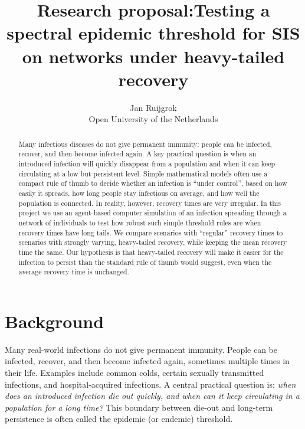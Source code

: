 \documentclass[11pt,a4paper]{article}
\title{Research proposal:Testing a spectral epidemic threshold for SIS on networks under heavy-tailed recovery}
\author{Jan Ruijgrok\\
  Open University of the Netherlands}
\date{} %
\begin{document}
\maketitle

\begin{abstract}
Many infectious diseases do not give permanent immunity: people can be infected, recover, and then become infected again. A key practical question is when an introduced infection will quickly disappear from a population and when it can keep circulating at a low but persistent level. Simple mathematical models often use a compact rule of thumb to decide whether an infection is ``under control'', based on how easily it spreads, how long people stay infectious on average, and how well the population is connected. In reality, however, recovery times are very irregular. In this project we use an agent-based computer simulation of an infection spreading through a network of individuals to test how robust such simple threshold rules are when recovery times have long tails. We compare scenarios with ``regular'' recovery times to scenarios with strongly varying, heavy-tailed recovery, while keeping the mean recovery time the same. Our hypothesis is that heavy-tailed recovery will make it easier for the infection to persist than the standard rule of thumb would suggest, even when the average recovery time is unchanged.
\end{abstract}

\section{Background}

Many real-world infections do not give permanent immunity. People can be infected, recover, and then become infected again, sometimes multiple times in their life. Examples include common colds, certain sexually transmitted infections, and hospital-acquired infections. A central practical question is: \emph{when does an introduced infection die out quickly, and when can it keep circulating in a population for a long time?} This boundary between die-out and long-term persistence is often called the epidemic (or endemic) threshold.
\end{document}
